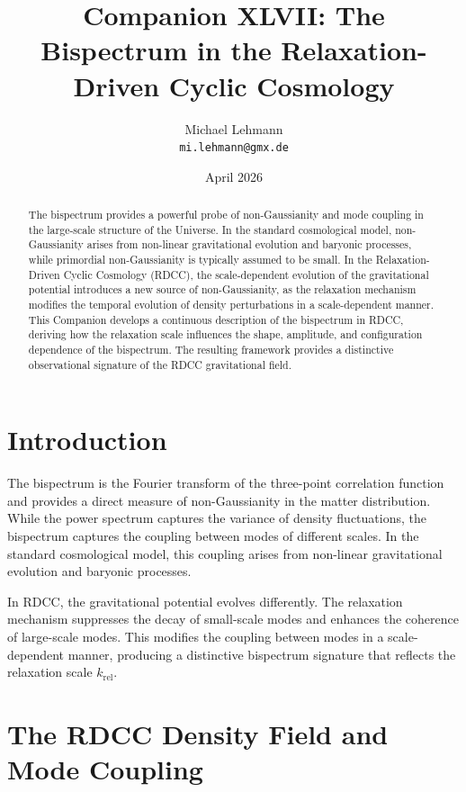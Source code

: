 \documentclass[11pt,a4paper]{article}
\title{\textbf{Companion XLVII: The Bispectrum in the Relaxation-Driven Cyclic Cosmology}}
\author{Michael Lehmann \\ \texttt{mi.lehmann@gmx.de}}
\date{April 2026}
\begin{document}
\maketitle

\begin{abstract}
The bispectrum provides a powerful probe of non-Gaussianity and mode coupling in 
the large-scale structure of the Universe. In the standard cosmological model, 
non-Gaussianity arises from non-linear gravitational evolution and baryonic 
processes, while primordial non-Gaussianity is typically assumed to be small. In 
the Relaxation-Driven Cyclic Cosmology (RDCC), the scale-dependent evolution of 
the gravitational potential introduces a new source of non-Gaussianity, as the 
relaxation mechanism modifies the temporal evolution of density perturbations in a 
scale-dependent manner. This Companion develops a continuous description of the 
bispectrum in RDCC, deriving how the relaxation scale influences the shape, 
amplitude, and configuration dependence of the bispectrum. The resulting framework 
provides a distinctive observational signature of the RDCC gravitational field.
\end{abstract}
\section{Introduction}

The bispectrum is the Fourier transform of the three-point correlation function and 
provides a direct measure of non-Gaussianity in the matter distribution. While the 
power spectrum captures the variance of density fluctuations, the bispectrum 
captures the coupling between modes of different scales. In the standard 
cosmological model, this coupling arises from non-linear gravitational evolution 
and baryonic processes.

In RDCC, the gravitational potential evolves differently. The relaxation mechanism 
suppresses the decay of small-scale modes and enhances the coherence of large-scale 
modes. This modifies the coupling between modes in a scale-dependent manner, 
producing a distinctive bispectrum signature that reflects the relaxation scale 
$k_{\mathrm{rel}}$.
\section{The RDCC Density Field and Mode Coupling}
\end{document}
